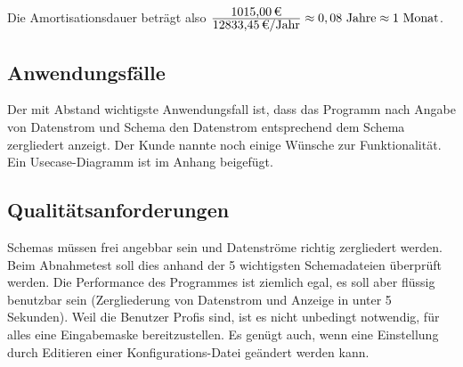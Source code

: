 Die Amortisationsdauer beträgt also $\frac{\eur{1015,00}}{\eur{12833,45}\mbox{/Jahr}} \approx 0,08 \mbox{ Jahre} \approx 1 \mbox{ Monat}$.


\subsection{Anwendungsfälle}
\label{sec:Anwendungsfaelle}
Der mit Abstand wichtigste Anwendungsfall ist, dass das Programm nach Angabe von Datenstrom und Schema den Datenstrom entsprechend dem Schema zergliedert anzeigt.
Der Kunde nannte noch einige Wünsche zur Funktionalität. Ein Usecase-Diagramm ist im Anhang beigefügt.


\subsection{Qualitätsanforderungen}
\label{sec:Qualitaetsanforderungen}
Schemas müssen frei angebbar sein und Datenströme richtig zergliedert werden.
Beim Abnahmetest soll dies anhand der 5 wichtigsten Schemadateien überprüft werden.
Die Performance des Programmes ist ziemlich egal, es soll aber flüssig benutzbar sein (Zergliederung von Datenstrom und Anzeige in unter 5 Sekunden).
Weil die Benutzer Profis sind, ist es nicht unbedingt notwendig, für alles eine Eingabemaske bereitzustellen. Es genügt auch, wenn eine Einstellung durch Editieren einer Konfigurations-Datei geändert werden kann.



